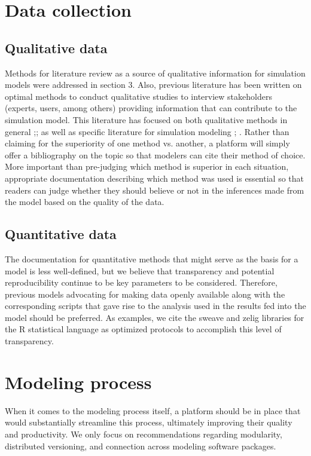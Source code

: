 \documentclass[11pt]{article}
\begin{document}
\section {Data collection}

\subsection {Qualitative data} 
Methods for literature review as a source of qualitative information for simulation models were addressed in section 3.  Also, previous literature has been written on optimal methods to conduct qualitative studies to interview stakeholders (experts, users, among others) providing information that can contribute to the simulation model.  This literature has focused on both qualitative methods in general \cite{Yin2002};\cite{Marshall2006}; \cite{Silverman2004}  as well as specific literature for simulation modeling \cite{Laws2004}; \cite{Luna-Reyes2003}.  Rather than claiming for the superiority of one method vs. another, a platform will simply offer a bibliography on the topic so that modelers can cite their method of choice.  More important than pre-judging which method is superior in each situation, appropriate documentation describing which method was used is essential so that readers can judge whether they should believe or not in the inferences made from the model based on the quality of the data. 


\subsection {Quantitative data}
The documentation for quantitative methods that might serve as the basis for a model is less well-defined, but we believe that transparency and potential reproducibility continue to be key parameters to be considered.  Therefore, previous models advocating for making data openly available along with the corresponding scripts that gave rise to the analysis used in the results fed into the model should be preferred.  As examples, we cite the sweave \cite{LEISCH2002} and zelig \cite{IMAI2006} libraries for the R statistical language \cite{r-project} as optimized protocols to accomplish this level of transparency. 

\section {Modeling process}
When it comes to the modeling process itself, a platform should be in place that would substantially streamline this process, ultimately improving their quality and productivity.  We only focus on recommendations regarding modularity, distributed versioning, and connection across modeling software packages.
\end{document}
